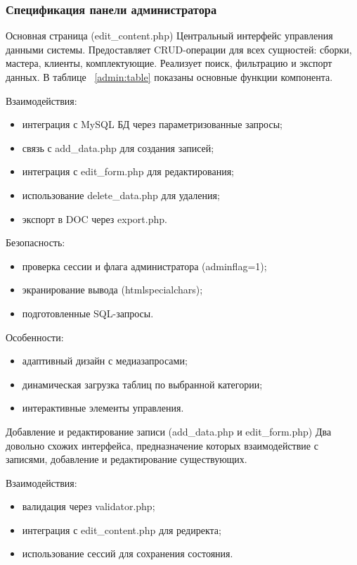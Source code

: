 \subsubsection{Спецификация панели администратора}
Основная страница (edit\_content.php)
Центральный интерфейс управления данными системы. Предоставляет CRUD-операции для всех сущностей: сборки, мастера, клиенты, комплектующие. Реализует поиск, фильтрацию и экспорт данных. В таблице ~\ref{admin:table} показаны основные функции компонента.

Взаимодействия:
\begin{itemize}
	\item интеграция с MySQL БД через параметризованные запросы;
	\item связь с add\_data.php для создания записей;
	\item интеграция с edit\_form.php для редактирования;
	\item использование delete\_data.php для удаления;
	\item экспорт в DOC через export.php.
\end{itemize}

Безопасность:
\begin{itemize}
	\item проверка сессии и флага администратора (adminflag=1);
	\item экранирование вывода (htmlspecialchars);
	\item подготовленные SQL-запросы.
\end{itemize}

Особенности:
\begin{itemize}
	\item адаптивный дизайн с медиазапросами;
	\item динамическая загрузка таблиц по выбранной категории;
	\item интерактивные элементы управления.
\end{itemize}

Добавление и редактирование записи (add\_data.php и edit\_form.php)
Два довольно схожих интерфейса, предназначение которых взаимодействие с записями, добавление и редактирование существующих. 

Взаимодействия:
\begin{itemize}
	\item валидация через validator.php;
	\item интеграция с edit\_content.php для редиректа;
	\item использование сессий для сохранения состояния.
\end{itemize}

